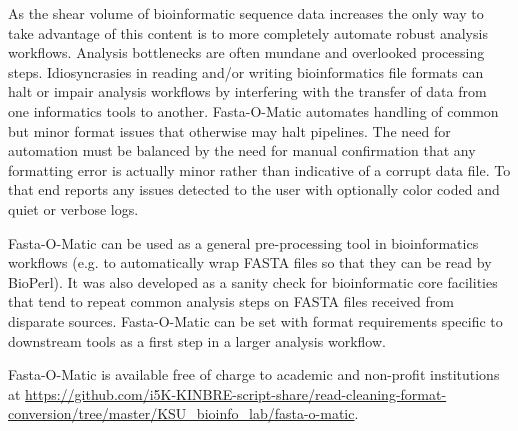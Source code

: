 As the shear volume of bioinformatic sequence data increases the only way to take advantage of this content is to more completely automate robust analysis workflows. Analysis bottlenecks are often mundane and overlooked processing steps. Idiosyncrasies in reading and/or writing bioinformatics file formats can halt or impair analysis workflows by interfering with the transfer of data from one informatics tools to another. Fasta-O-Matic automates handling of common but minor format issues that otherwise may halt pipelines. The need for automation must be balanced by the need for manual confirmation that any formatting error is actually minor rather than indicative of a corrupt data file. To that end reports any issues detected to the user with optionally color coded and quiet or verbose logs.

Fasta-O-Matic can be used as a general pre-processing tool in bioinformatics workflows (e.g. to automatically wrap FASTA files so that they can be read by BioPerl). It was also developed as a sanity check for bioinformatic core facilities that tend to repeat common analysis steps on FASTA files received from disparate sources. Fasta-O-Matic can be set with format requirements specific to downstream tools as a first step in a larger analysis workflow.

Fasta-O-Matic is available free of charge to academic and non-profit institutions at \url{https://github.com/i5K-KINBRE-script-share/read-cleaning-format-conversion/tree/master/KSU\_bioinfo\_lab/fasta-o-matic}.
  
  
  
  
  
  
  